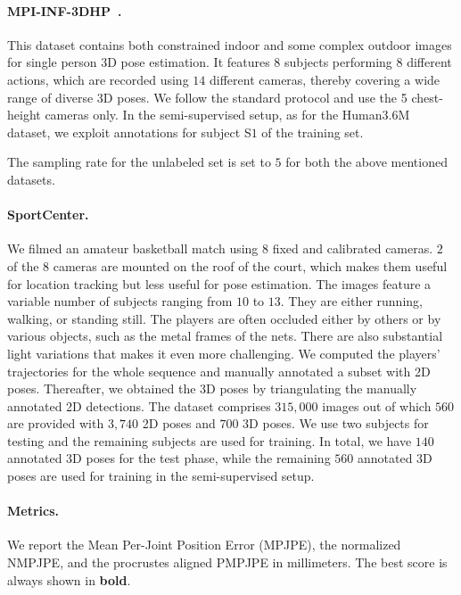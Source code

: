 \documentclass[runningheads]{llncs}
\begin{document}
\paragraph{MPI-INF-3DHP~\cite{Mehta17a}. }

This dataset contains both constrained indoor and some complex outdoor images for single person 3D pose estimation. It features $8$ subjects performing $8$ different actions, which are recorded using $14$ different cameras, thereby covering a wide range of diverse 3D poses. We follow the standard protocol and use the 5 chest-height cameras only. In the semi-supervised setup, as for the Human3.6M dataset, we exploit annotations  for subject  S$1$ of the training set.

The sampling rate for the unlabeled set is set to $5$ for both the above mentioned datasets.

\paragraph{SportCenter.} We filmed an amateur basketball match using $8$ fixed and calibrated cameras. $2$ of the $8$ cameras are mounted on the roof of the court, which makes them useful for location tracking but less useful for pose estimation.  The images feature a variable number of subjects ranging from $10$ to $13$. They are either running, walking, or standing still. The players are often occluded either by others or by various objects, such as the metal frames of the nets. There are also substantial light variations that makes it even more challenging. We computed the players' trajectories for the whole sequence and manually annotated a subset with 2D poses. Thereafter, we obtained the 3D poses by triangulating the manually annotated 2D detections. The dataset comprises $315,000$ images out of which $560$ are provided with $3,740$ 2D poses and $700$ 3D poses. We use two subjects for testing and the remaining subjects are used for training. In total, we have $140$ annotated 3D poses for the test phase, while the remaining $560$ annotated 3D poses are used for training in the semi-supervised setup. 

\paragraph{Metrics.} 

We report the Mean Per-Joint Position Error (MPJPE), the normalized NMPJPE, and the procrustes aligned PMPJPE in millimeters. The best score is always shown in \textbf{bold}.
\end{document}
